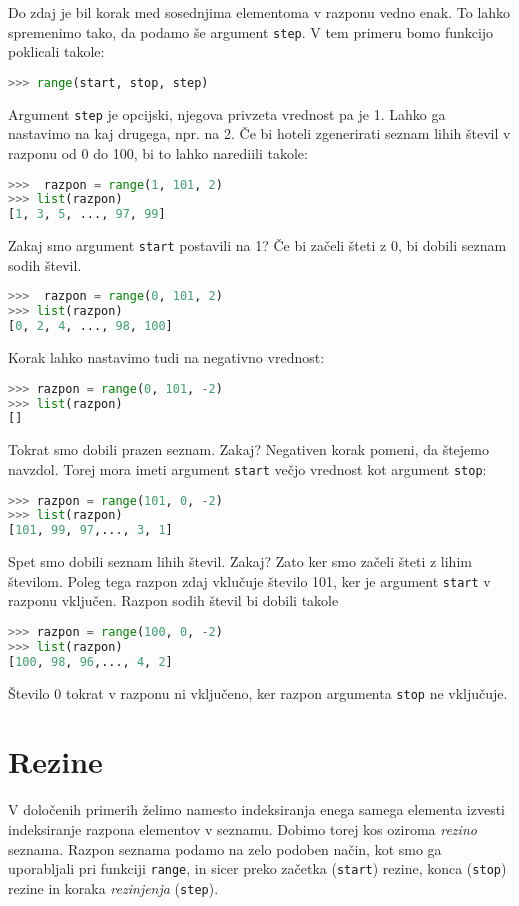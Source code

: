 Do zdaj je bil korak med sosednjima elementoma v razponu vedno enak. To lahko spremenimo tako, da podamo še argument \texttt{step}. V tem primeru bomo funkcijo poklicali takole:
\begin{lstlisting}[language=Python]
>>> range(start, stop, step)
\end{lstlisting}
Argument \texttt{step} je opcijski, njegova privzeta vrednost pa je 1. Lahko ga nastavimo na kaj drugega, npr. na 2. Če bi hoteli zgenerirati seznam lihih števil v razponu od 0 do 100, bi to lahko narediili takole:
\begin{lstlisting}[language=Python]
>>>  razpon = range(1, 101, 2)
>>> list(razpon)
[1, 3, 5, ..., 97, 99]
\end{lstlisting}
Zakaj smo argument \texttt{start} postavili na 1? Če bi začeli šteti z 0, bi dobili seznam sodih števil.
\begin{lstlisting}[language=Python]
>>>  razpon = range(0, 101, 2)
>>> list(razpon)
[0, 2, 4, ..., 98, 100]
\end{lstlisting}
Korak lahko nastavimo tudi na negativno vrednost:
\begin{lstlisting}[language=Python]
>>> razpon = range(0, 101, -2)
>>> list(razpon)
[]
\end{lstlisting}
Tokrat smo dobili prazen seznam. Zakaj? Negativen korak pomeni, da štejemo navzdol. Torej mora imeti argument \texttt{start} večjo vrednost kot argument \texttt{stop}:
\begin{lstlisting}[language=Python]
>>> razpon = range(101, 0, -2)
>>> list(razpon)
[101, 99, 97,..., 3, 1]
\end{lstlisting}
Spet smo dobili seznam lihih števil. Zakaj? Zato ker smo začeli šteti z lihim številom. Poleg tega razpon zdaj vklučuje število 101, ker je argument \texttt{start} v razponu vključen. Razpon sodih števil bi dobili takole
\begin{lstlisting}[language=Python]
>>> razpon = range(100, 0, -2)
>>> list(razpon)
[100, 98, 96,..., 4, 2]
\end{lstlisting}
Število 0 tokrat v razponu ni vključeno, ker razpon argumenta \texttt{stop} ne vključuje. 

\section{Rezine}

V določenih primerih želimo namesto indeksiranja enega samega elementa izvesti indeksiranje razpona elementov v seznamu. Dobimo torej kos oziroma \emph{rezino}  seznama. Razpon seznama podamo na zelo podoben način, kot smo ga uporabljali pri funkciji \texttt{range}, in sicer preko začetka (\texttt{start}) rezine, konca (\texttt{stop}) rezine in koraka \emph{rezinjenja} (\texttt{step}).

